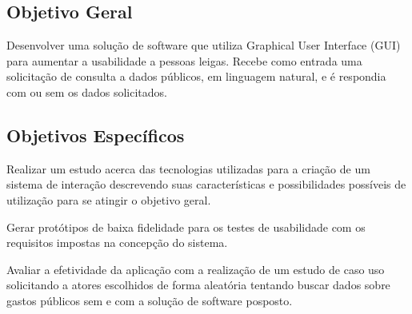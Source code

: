 \subsection{Objetivo Geral}
Desenvolver uma solução de software que utiliza Graphical User Interface (GUI) para aumentar a usabilidade a pessoas leigas. Recebe como entrada uma solicitação de consulta  a dados públicos, em linguagem natural, e é respondia com ou sem os dados solicitados.

\subsection{Objetivos Específicos}
Realizar um estudo acerca das tecnologias utilizadas para a criação de um sistema de interação descrevendo suas características e possibilidades possíveis de utilização para se atingir o objetivo geral.

Gerar protótipos de baixa fidelidade para os testes de usabilidade com os requisitos impostas na concepção do sistema.

Avaliar a efetividade da aplicação com a realização de um estudo de caso uso solicitando a atores escolhidos de forma aleatória tentando buscar dados sobre gastos públicos sem e com a solução de software posposto.
